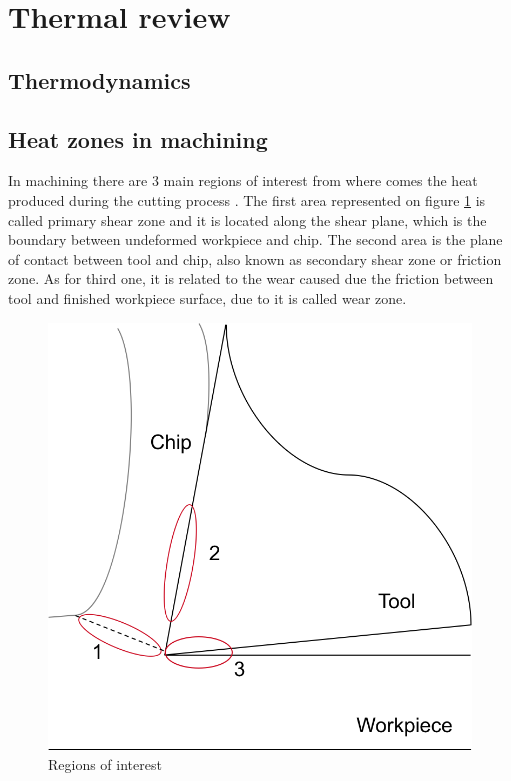 \section{Thermal review}
	\subsection{Thermodynamics}

	\subsection{Heat zones in machining}

	In machining there are 3 main regions of interest from where comes the heat produced during the cutting process \cite{shaw2005metal}. The first area represented on figure \ref{fig:heatZones} is called primary shear zone and it is located along the shear plane, which is the boundary between undeformed workpiece and chip. The second area is the plane of contact between tool and chip, also known as secondary shear zone or friction zone. As for third one, it is related to the wear caused due the friction between tool and finished workpiece surface, due to it is called wear zone.

	\begin{figure}[h]
		\centering
		\captionsetup{justification=centering}
		\includegraphics[scale=0.5]{Imagens/heatZones.png}
		\caption{Regions of interest}
		\label{fig:heatZones}
	\end{figure}

